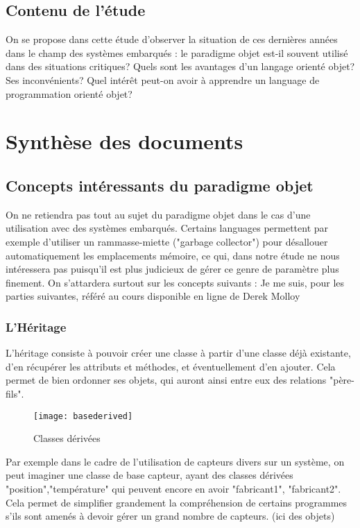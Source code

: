 \documentclass[12pt]{article} %
\begin{document}
\subsection{Contenu de l'étude}
On se propose dans cette étude d'observer la situation de ces dernières années dans le champ des systèmes embarqués : le paradigme objet est-il souvent utilisé dans des situations critiques? 
Quels sont les avantages d'un langage orienté objet? Ses inconvénients?
Quel intérêt peut-on avoir à apprendre un language de programmation orienté objet?


\newpage

\section{Synthèse des documents} 


\subsection{Concepts intéressants du paradigme objet}
On ne retiendra pas tout au sujet du paradigme objet dans le cas d'une utilisation avec des systèmes embarqués. Certains languages permettent par exemple d'utiliser un rammasse-miette ("garbage collector") pour désallouer automatiquement les emplacements mémoire, ce qui, dans notre étude ne nous intéressera pas puisqu'il est plus judicieux de gérer ce genre de paramètre plus finement. 
On s'attardera surtout sur les concepts suivants :
Je me suis, pour les parties suivantes, référé au cours disponible en ligne de Derek Molloy\cite{OOPEmbedded}
\subsubsection{L'Héritage}
L'héritage consiste à pouvoir créer une classe à partir d'une classe déjà existante, d'en récupérer les attributs et méthodes, et éventuellement d'en ajouter.
Cela permet de bien ordonner ses objets, qui auront ainsi entre eux des relations "père-fils".
\begin{wrapfigure}{l}{0.5\textwidth} %
  \begin{center}
    \texttt{[image: basederived]}
  \end{center}
  \caption{Classes dérivées}
\end{wrapfigure}
Par exemple dans le cadre de l'utilisation de capteurs divers sur un système, on peut imaginer une classe de base capteur, ayant des classes dérivées "position","température" qui peuvent encore en avoir "fabricant1", "fabricant2".
Cela permet de simplifier grandement la compréhension de certains programmes s'ils sont amenés à devoir gérer un grand nombre de capteurs. (ici des objets)
\end{document}
